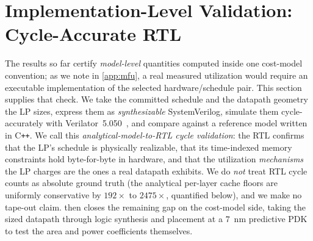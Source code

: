 \section{Implementation-Level Validation: Cycle-Accurate RTL}
\label{sec:rtl_validation}

The results so far certify \emph{model-level} quantities computed inside one
cost-model convention; as we note in \cref{app:mfu}, a real measured
utilization would require an executable implementation of the selected
hardware/schedule pair. This section supplies that check. We take the
committed schedule and the datapath geometry the LP sizes, express them as
\emph{synthesizable} SystemVerilog, simulate them cycle-accurately with
Verilator~5.050~\citep{snyder_verilator}, and compare against a reference model
written in C\texttt{++}. We call this \emph{analytical-model-to-RTL cycle
validation}: the RTL confirms that the LP's schedule is physically
realizable, that its time-indexed memory constraints hold byte-for-byte in
hardware, and that the utilization \emph{mechanisms} the LP charges are the
ones a real datapath exhibits. We do \emph{not} treat RTL cycle counts as
absolute ground truth (the analytical per-layer cache floors are uniformly
conservative by $192\times$ to $2475\times$, quantified below), and we make
no tape-out claim.  then closes the remaining gap on the
cost-model side, taking the sized datapath through logic synthesis and
placement at a $7$~nm predictive PDK to test the area and power coefficients
themselves.


